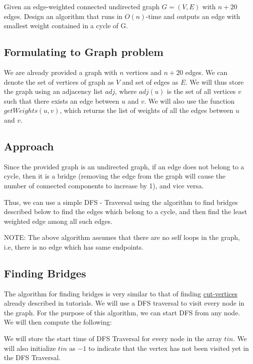 \documentclass{article}
\begin{document}
Given an edge-weighted connected undirected graph $G = (V, E)$ with $n + 20$ edges. Design an algorithm that runs in $O(n)$-time and outputs an edge with smallest weight contained in a cycle of G.

\subsection{Formulating to Graph problem}

We are already provided a graph with $n$ vertices and $n + 20$ edges. We can denote the set of vertices of graph as $V$ and set of edges as $E$. We will thus store the graph using an adjacency list $adj$, where $adj(u)$ is the set of all vertices $v$ such that there exists an edge between $u$ and $v$. We will also use the function $getWeights(u, v)$, which returns the list of weights of all the edges between $u$ and $v$.

\subsection{Approach}

Since the provided graph is an undirected graph, if an edge does not belong to a cycle, then it is a bridge (removing the edge from the graph will cause the number of connected components to increase by 1), and vice versa. 

Thus, we can use a simple DFS - Traversal using the algorithm to find bridges described below to find the edges which belong to a cycle, and then find the least weighted edge among all such edges.

NOTE: The above algorithm assumes that there are no self loops in the graph, i.e, there is no edge which has same endpoints.

\subsection{Finding Bridges}

The algorithm for finding bridges is very similar to that of finding \underline{cut-vertices} already described in tutorials. We will use a DFS traversal to visit every node in the graph. For the purpose of this algorithm, we can start DFS from any node. We will then compute the following:

We will store the start time of DFS Traversal for every node in the array $tin$. We will also initialize $tin$ as $-1$ to indicate that the vertex has not been visited yet in the DFS Traversal.
\end{document}
